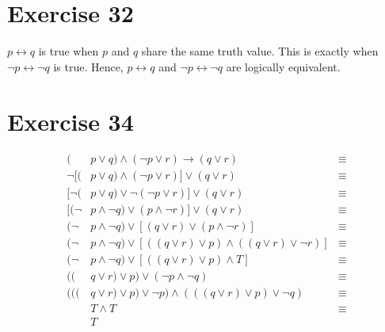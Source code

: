 \documentclass{article}
\let\biconditional\leftrightarrow
\let\conditional\rightarrow
\begin{document}
\pagebreak
\section{Exercise 32}
$p \biconditional q$ is true when $p$ and $q$ share the same truth value. This is exactly when $\neg p \biconditional \neg q$ is true. Hence, $p \biconditional q$ and $\neg p \biconditional \neg q$ are logically equivalent.

\pagebreak
\section{Exercise 34}
\begin{align*}
	(       & p \lor q) \land (\neg p \lor r) \conditional (q \lor r)                   & \equiv \\
	\neg [( & p \lor q) \land (\neg p \lor r)] \lor (q \lor r)                          & \equiv \\
	[\neg ( & p \lor q) \lor \neg (\neg p \lor r)] \lor (q \lor r)                      & \equiv \\
	[(\neg  & p \land \neg q) \lor (p \land \neg r)] \lor (q \lor r)                    & \equiv \\
	(\neg   & p \land \neg q) \lor [(q \lor r) \lor (p \land \neg r)]                   & \equiv \\
	(\neg   & p \land \neg q) \lor [((q \lor r) \lor p) \land ((q \lor r) \lor \neg r)] & \equiv \\
	(\neg   & p \land \neg q) \lor [((q \lor r) \lor p) \land T]                        & \equiv \\
	((      & q \lor r) \lor p) \lor (\neg p \land \neg q)                              & \equiv \\
	(((     & q \lor r) \lor p) \lor \neg p) \land (((q \lor r) \lor p) \lor \neg q)    & \equiv \\
	        & T \land T                                                                 & \equiv \\
	        & T
\end{align*}
\end{document}
